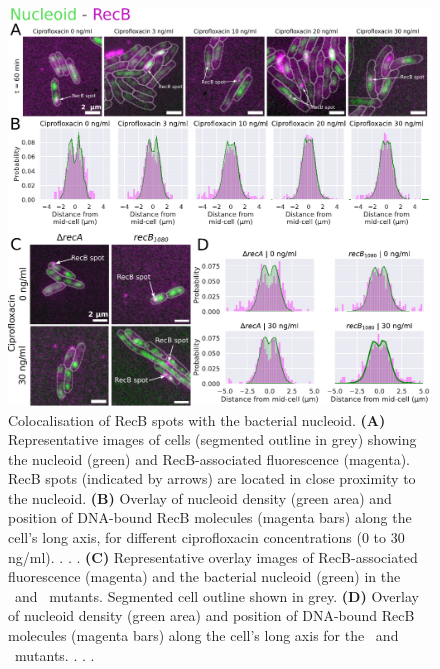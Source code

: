 \begin{figure}[htbp]
    \centering
    \includegraphics[width=.8\textwidth]{Figures/Fig4_nucleoid.pdf}
    \caption{Colocalisation of RecB spots with the bacterial nucleoid. \textbf{(A)} Representative images of cells (segmented outline in grey) showing the nucleoid (green) and RecB-associated fluorescence (magenta). RecB spots (indicated by arrows) are located in close proximity to the nucleoid. \textbf{(B)} Overlay of nucleoid density (green area) and position of DNA-bound RecB molecules (magenta bars) along the cell's long axis, for different ciprofloxacin concentrations (0 to 30 ng/ml). . . . \textbf{(C)} Representative overlay images of RecB-associated fluorescence (magenta) and the bacterial nucleoid (green) in the \dreca\ and \geneteneighty\ mutants. Segmented cell outline shown in grey. \textbf{(D)} Overlay of nucleoid density (green area) and position of DNA-bound RecB molecules (magenta bars) along the cell's long axis for the \dreca\ and \geneteneighty\ mutants. . . .}
    \label{Fig:nucleoid}
\end{figure}

